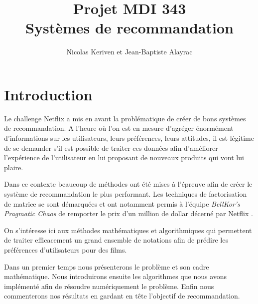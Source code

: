 \documentclass[10pt,a4paper]{article}
\title{Projet MDI 343 \\
Systèmes de recommandation}
\author{Nicolas Keriven et Jean-Baptiste Alayrac}
\begin{document}
\maketitle

\hrulefill
\vspace{2cm}

\newcommand{\jel}{\textsc{Jellyfish} }
\renewcommand{\tablename}{TABLEAU}

%
%


\newpage
\tableofcontents

\section*{Introduction}
 
 Le challenge Netflix a mis en avant la problématique de créer de bons systèmes de recommandation. A l'heure où l'on est en mesure d'agréger énormément d'informations sur les utilisateurs, leurs préférences, leurs attitudes, il est légitime de se demander s'il est possible de traiter ces données afin d'améliorer l'expérience de l'utilisateur en lui proposant de nouveaux produits qui vont lui plaire.
 
 Dans ce contexte beaucoup de méthodes ont été mises à l'épreuve afin de créer le système de recommandation le plus performant. Les techniques de factorisation de matrice se sont démarquées et ont notamment permis à l'équipe \textit{BellKor's Pragmatic Chaos} de remporter le prix d'un million de dollar décerné par Netflix \cite{koren}.
 
 On s'intéresse ici aux méthodes mathématiques et algorithmiques qui permettent de traiter efficacement un grand ensemble de notations afin de prédire les préférences d'utilisateurs pour des films.
 
 Dans un premier temps nous présenterons le problème et son cadre mathématique. Nous introduirons ensuite les algorithmes que nous avons implémenté afin de résoudre numériquement le problème. Enfin nous commenterons nos résultats en gardant en tête l'objectif de recommandation.
\newpage
\end{document}
